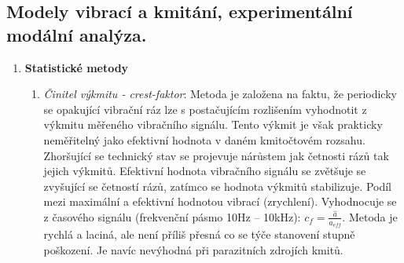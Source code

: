 \subsection{Modely vibrací a kmitání, experimentální modální analýza.}
\begin{enumerate}[label=(\alph*)]
\item \textbf{Statistické metody}
\begin{enumerate}[label=(\roman*)]
\item \textit{Činitel výkmitu - crest-faktor}: Metoda je založena na faktu, že periodicky se opakující vibrační ráz lze s postačujícím rozlišením vyhodnotit z výkmitu měřeného vibračního signálu. Tento výkmit je však prakticky neměřitelný jako efektivní hodnota v daném kmitočtovém rozsahu. Zhoršující se technický stav se projevuje nárůstem jak četnosti rázů tak jejich výkmitů. Efektivní hodnota vibračního signálu se zvětšuje se zvyšující se četností rázů, zatímco se hodnota výkmitů stabilizuje. Podíl mezi maximální a efektivní hodnotou vibrací (zrychlení). Vyhodnocuje se z časového signálu (frekvenční pásmo 10Hz – 10kHz): $ c_f = \frac{\hat{a}}{a_{eff}} $. Metoda je rychlá a laciná, ale není příliš přesná co se týče stanovení stupně poškození. Je navíc nevýhodná při parazitních zdrojích kmitů.


\end{enumerate}
\end{enumerate}
